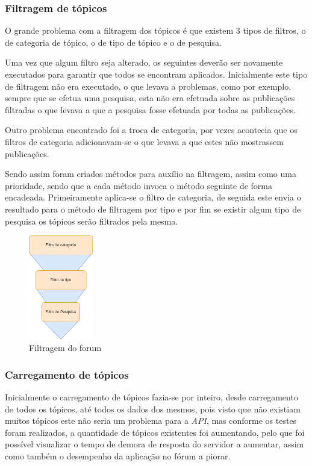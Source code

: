 \subsubsection{Filtragem de tópicos}
O grande problema com a filtragem dos tópicos é que existem 3 tipos de filtros, o de categoria de tópico, o de tipo de tópico e o de pesquisa. 

Uma vez que algum filtro seja alterado, os seguintes deverão ser novamente executados para garantir que todos se encontram aplicados. Inicialmente este tipo de filtragem não era executado, o que levava a problemas, como por exemplo, sempre que se efetua uma pesquisa, esta não era efetuada sobre as publicações filtradas o que levava a que a pesquisa fosse efetuada por todas as publicações.

Outro problema encontrado foi a troca de categoria, por vezes acontecia que os filtros de categoria adicionavam-se o que levava a que estes não mostrassem publicações.

Sendo assim foram criados métodos para auxílio na filtragem, assim como uma prioridade, sendo que a cada método invoca o método seguinte de forma encadeada. Primeiramente aplica-se o filtro de categoria, de seguida este envia o resultado para o método de filtragem por tipo e por fim se existir algum tipo de pesquisa os tópicos serão filtrados pela mesma.

\begin{figure}[htb]
  \centering
  \includegraphics[width=0.25\textwidth]{images/implementacao/frontend/forum/filtros/filtros.png}
  \caption{Filtragem do forum}
  \label{fig:73}
\end{figure}

\newpage

\subsubsection{Carregamento de tópicos}
Inicialmente o carregamento de tópicos fazia-se por inteiro, desde carregamento de todos os tópicos, até todos os dados dos mesmos, pois visto que não existiam muitos tópicos este não seria um problema para a \textit{API}, mas conforme os testes foram realizados, a quantidade de tópicos existentes foi aumentando, pelo que foi possível visualizar o tempo de demora de resposta do servidor a aumentar, assim como também o desempenho da aplicação no fórum a piorar.


